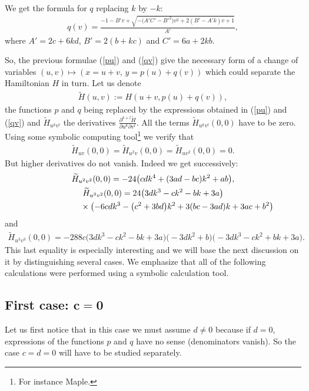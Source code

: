 \documentclass[10pt,a4paper]{amsart}
\numberwithin{equation}{section}
\begin{document}
We get the formula for $q$ replacing $k$ by $-k$:
\begin{gather}\label{qv}
q(v)=\frac{-1-B'v+\sqrt{-\big(A'C'-B'^2\big)v^2+2(B'-A'k)v+1}}{A'},
\end{gather}
where $A'=2c+6kd$, $B'=2(b+kc)$ and $C'=6a+2kb$.

So, the previous formulae (\ref{pu}) and (\ref{qv}) give the necessary form of a change of variables $(u,v)\mapsto(x=u+v,\,y=p(u)+q(v))$ which could separate the Hamiltonian $H$ in turn. Let us denote
\begin{gather*}
\widetilde{H}(u,v):=H(u+v,p(u)+q(v)),
\end{gather*}
the functions $p$ and $q$ being replaced by the expressions obtained in (\ref{pu}) and (\ref{qv}) and $\widetilde{H}_{u^kv^l}$ the derivatives $\frac{\partial^{k+l}\widetilde{H}}{\partial u^k\partial v^l}$.
All the terms $\widetilde{H}_{u^kv^l}(0,0)$ have to be zero. Using some symbolic computing tool\footnote{For instance Maple.} we verify that
\begin{gather*}
\widetilde{H}_{uv}(0,0)=\widetilde{H}_{u^2v}(0,0)=\widetilde{H}_{uv^2}(0,0)=0.
\end{gather*}
But higher derivatives do not vanish. Indeed we get successively:
\begin{gather}\label{eq1}
\widetilde{H}_{u^2v^2}(0,0)=-24\big(cdk^4+(3ad-bc)k^2+ab\big),
\\
\widetilde{H}_{u^3v^2}(0,0)=24\big(3dk^3-ck^2-bk+3a\big)\nonumber
\\ \hphantom{\widetilde{H}_{u^3v^2}(0,0)=}
{}\times\big({-}6cdk^3-\big(c^2+3bd\big)k^2+3(bc-3ad)k+3ac+b^2\big)
\label{eq2}
\end{gather}
and
\begin{gather}\label{eq3}
\widetilde{H}_{u^3v^3}(0,0)=-288c\big(3dk^3-ck^2-bk+3a\big)\big({-}3dk^2+b\big)\big({-}3dk^3-ck^2+bk+3a\big).
\end{gather}
This last equality is especially interesting and we will base the next discussion on it by distinguishing several cases. We emphasize that all of the following calculations were performed using a symbolic calculation tool.

\subsection*{First case: $\boldsymbol {c=0}$}

Let us first notice that in this case we must assume $d\not=0$ because if $d=0$, expressions of the functions $p$ and $q$ have no sense (denominators vanish). So the case $c=d=0$ will have to be studied separately.
\end{document}
